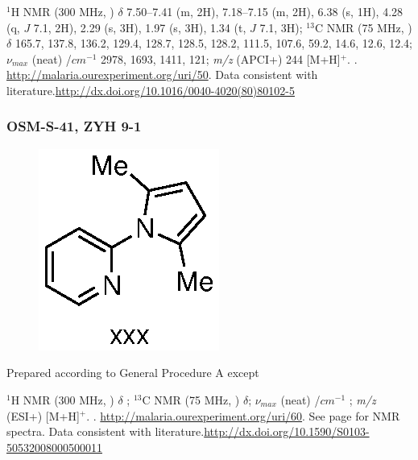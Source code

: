 \documentclass[12pt, a4paper,titlepage]{article}
\begin{document}
$^1$H NMR (300 MHz, ) $\delta$  7.50--7.41 (m, 2H), 7.18--7.15 (m, 2H), 6.38 (s, 1H), 4.28 (q, $J$ 7.1, 2H), 2.29 (s, 3H), 1.97 (s, 3H), 1.34 (t, $J$ 7.1, 3H); 
$^{13}$C NMR (75 MHz, ) $\delta$ 165.7, 137.8, 136.2, 129.4, 128.7, 128.5, 128.2, 111.5, 107.6, 59.2, 14.6, 12.6, 12.4; 
 $\nu_{max}$ (neat) /$cm^{-1}$ 2978, 1693, 1411, 121;
\emph{m/z} (APCI+) 244 [M+H]$^+$.
.
\url{http://malaria.ourexperiment.org/uri/50}.
Data consistent with literature.\url{http://dx.doi.org/10.1016/0040-4020(80)80102-5}

\subsubsection*{OSM-S-41, ZYH 9-1}
\label{exp:ZYH9}
	\begin{figure}[H]
	\begin{center}
	\includegraphics{exp/ZYH9.eps}
	\end{center}
	\vspace{-25pt}	
	\end{figure}	

Prepared according to General Procedure A except

$^1$H NMR (300 MHz, ) $\delta$ ; 
$^{13}$C NMR (75 MHz, ) $\delta$;
 $\nu_{max}$ (neat) /$cm^{-1}$ ;
\emph{m/z} (ESI+) [M+H]$^+$.
.
\url{http://malaria.ourexperiment.org/uri/60}.
 See page \pageref{spec:ZYH9} for NMR spectra. Data consistent with literature.\url{http://dx.doi.org/10.1590/S0103-50532008000500011}
\end{document}
